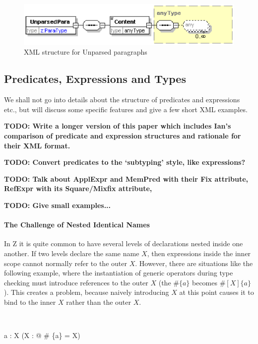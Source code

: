 \documentclass{llncs}  %
\newcommand{\TODO}[1]{\textbf{TODO: #1}}   %
\begin{document}
\begin{figure}[htbp]
  \centering
  \includegraphics[width=\textwidth]{unparsedpara.eps}
  \caption{XML structure for Unparsed paragraphs}
  \label{fig:unparsed}
\end{figure}


\subsection{Predicates, Expressions and Types}

We shall not go into details about the structure of predicates and
expressions etc., but will discuss some specific features and give
a few short XML examples.

\TODO{Write a longer version of this paper which includes Ian's
  comparison of predicate and expression structures and rationale
  for their XML format.}

\TODO{Convert predicates to the `subtyping' style, like expressions?}

\TODO{Talk about ApplExpr and MemPred with their Fix attribute, RefExpr
  with its Square/Mixfix attribute, }

\TODO{Give small examples...}


\paragraph{The Challenge of Nested Identical Names}

In Z it is quite common to have several levels of declarations nested 
inside one another.  If two levels declare the same name $X$, then
expressions inside the inner scope cannot normally refer to the outer $X$.
However, there are situations like the following example, where the
instantiation of generic operators during type checking must
introduce references to the outer $X$ (the $\# \{a\}$ becomes
$\#[X]\{a\}$). This creates a problem, because naively introducing
$X$ at this point causes it to bind to the inner $X$ rather than 
the outer $X$. 
\begin{zed}
    [X] \\
\end{zed}
\begin{axdef}
    a : X
\where
    (\exists X : \nat @ \# \{a\} = X)
\end{axdef}
\end{document}
